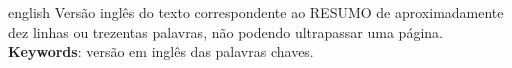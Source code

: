 \begin{resumo}[Abstract]
 \begin{otherlanguage*}{english}
   Versão inglês do texto correspondente ao RESUMO de aproximadamente dez linhas ou trezentas palavras, não podendo ultrapassar uma página.\\
   \noindent 
   \textbf{Keywords}: versão em inglês das palavras chaves.
 \end{otherlanguage*}
\end{resumo}